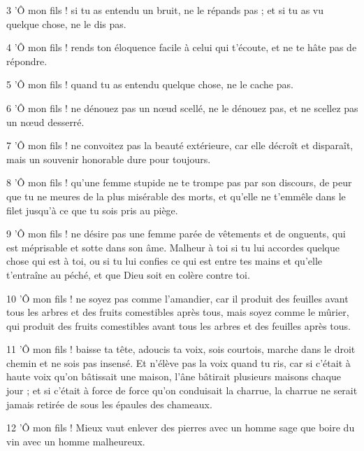 \par 3 'Ô mon fils ! si tu as entendu un bruit, ne le répands pas ; et si tu as vu quelque chose, ne le dis pas.

\par 4 'Ô mon fils ! rends ton éloquence facile à celui qui t'écoute, et ne te hâte pas de répondre.

\par 5 'Ô mon fils ! quand tu as entendu quelque chose, ne le cache pas.

\par 6 'Ô mon fils ! ne dénouez pas un nœud scellé, ne le dénouez pas, et ne scellez pas un nœud desserré.

\par 7 'Ô mon fils ! ne convoitez pas la beauté extérieure, car elle décroît et disparaît, mais un souvenir honorable dure pour toujours.

\par 8 'Ô mon fils ! qu'une femme stupide ne te trompe pas par son discours, de peur que tu ne meures de la plus misérable des morts, et qu'elle ne t'emmêle dans le filet jusqu'à ce que tu sois pris au piège.

\par 9 'Ô mon fils ! ne désire pas une femme parée de vêtements et de onguents, qui est méprisable et sotte dans son âme. Malheur à toi si tu lui accordes quelque chose qui est à toi, ou si tu lui confies ce qui est entre tes mains et qu'elle t'entraîne au péché, et que Dieu soit en colère contre toi.

\par 10 'Ô mon fils ! ne soyez pas comme l'amandier, car il produit des feuilles avant tous les arbres et des fruits comestibles après tous, mais soyez comme le mûrier, qui produit des fruits comestibles avant tous les arbres et des feuilles après tous.

\par 11 'Ô mon fils ! baisse ta tête, adoucis ta voix, sois courtois, marche dans le droit chemin et ne sois pas insensé. Et n'élève pas la voix quand tu ris, car si c'était à haute voix qu'on bâtissait une maison, l'âne bâtirait plusieurs maisons chaque jour ; et si c'était à force de force qu'on conduisait la charrue, la charrue ne serait jamais retirée de sous les épaules des chameaux.

\par 12 'Ô mon fils ! Mieux vaut enlever des pierres avec un homme sage que boire du vin avec un homme malheureux.

